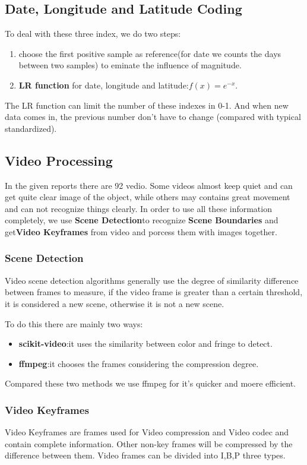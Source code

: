 \documentclass[12pt]{article}
\begin{document}
\subsection{Date, Longitude and Latitude Coding}
To deal with these three index, we do two steps:
\begin{enumerate}
	\item choose the first positive sample as reference(for date we counts the days between two samples) to eminate the influence of magnitude.
	\item \textbf{ LR function} for date, longitude and latitude:$f(x)=e^{-x}$.
	
\end{enumerate} 

The LR function can limit the number of these indexes in 0-1. And when new data comes in, the previous number don't have to change (compared with typical standardized).
\subsection{Video Processing}
In the given reports there are 92 vedio. Some videos almost keep quiet and can get quite clear image of the object, while others may contains great movement and can not recognize things clearly. In order to use all these information completely, we use \textbf{Scene Detection}to recognize \textbf{Scene Boundaries} and get\textbf{Video Keyframes} from video and porcess them with images together.

\subsubsection{Scene Detection}
Video scene detection algorithms generally use the degree of similarity difference between frames to measure, if the video frame is greater than a certain threshold, it is considered a new scene, otherwise it is not a new scene.

To do this there are mainly two ways:
\begin{itemize}
	\item \textbf{scikit-video}\cite{scikitvideo}:it uses the similarity between color and fringe to detect.
	\item \textbf{ffmpeg}\cite{ffmpeg}:it chooses the frames considering the compression degree.
\end{itemize}
Compared these two methods we use ffmpeg for it's quicker and moere efficient.

\subsubsection{Video Keyframes}
Video Keyframes are frames used for Video compression and Video codec and contain complete information. Other non-key frames will be compressed by the difference between them. Video frames can be divided into I,B,P three types.
\end{document}
